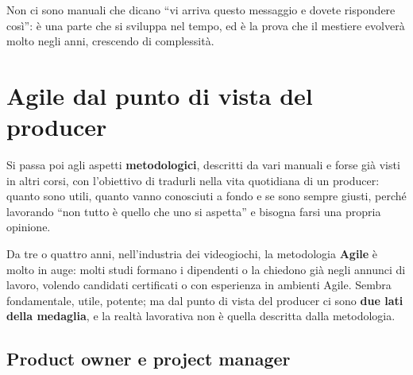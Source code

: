 Non ci sono manuali che dicano ``vi arriva questo messaggio e dovete rispondere
così'': è una parte che si sviluppa nel tempo, ed è la prova che il mestiere
evolverà molto negli anni, crescendo di complessità.

\section{Agile dal punto di vista del producer}
\label{sec:z5-agile}

Si passa poi agli aspetti \textbf{metodologici}, descritti da vari manuali e
forse già visti in altri corsi, con l'obiettivo di tradurli nella vita
quotidiana di un producer: quanto sono utili, quanto vanno conosciuti a fondo e
se sono sempre giusti, perché lavorando ``non tutto è quello che uno si
aspetta'' e bisogna farsi una propria opinione.

Da tre o quattro anni, nell'industria dei videogiochi, la metodologia
\textbf{Agile} è molto in auge: molti studi formano i dipendenti o la chiedono
già negli annunci di lavoro, volendo candidati certificati o con esperienza in
ambienti Agile. Sembra fondamentale, utile, potente; ma dal punto di vista del
producer ci sono \textbf{due lati della medaglia}, e la realtà lavorativa non è
quella descritta dalla metodologia.

\subsection{Product owner e project manager}

